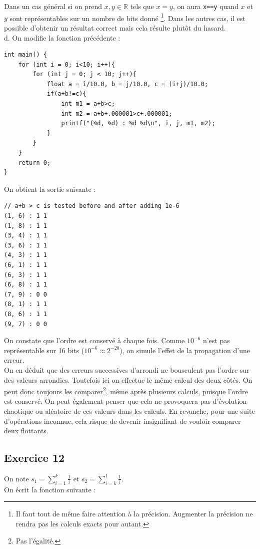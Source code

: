 \documentclass[11pt, a4 paper]{article}
\begin{document}
Dans un cas général si on prend $x, y \in \mathbb{R}$ tels que $x=y$, on aura \texttt{x==y} quand $x$ et $y$ sont représentables sur un nombre de bits donné
    \footnote{
        Il faut tout de même faire attention à la précision.
        Augmenter la précision ne rendra pas les calculs exacts pour autant.
    }.
Dans les autres cas, il est possible d'obtenir un résultat correct mais cela résulte plutôt du hasard.\\

d. On modifie la fonction précédente :
\begin{lstlisting}[style=CStyle]
int main() {
    for (int i = 0; i<10; i++){
        for (int j = 0; j < 10; j++){
            float a = i/10.0, b = j/10.0, c = (i+j)/10.0;
            if(a+b!=c){
                int m1 = a+b>c;
                int m2 = a+b+.000001>c+.000001;
                printf("(%d, %d) : %d %d\n", i, j, m1, m2);
            }
        }
    } 
    return 0;
}
\end{lstlisting}

On obtient la sortie suivante :
\begin{lstlisting}[style=CStyle]
// a+b > c is tested before and after adding 1e-6
(1, 6) : 1 1
(1, 8) : 1 1
(3, 4) : 1 1
(3, 6) : 1 1
(4, 3) : 1 1
(6, 1) : 1 1
(6, 3) : 1 1
(6, 8) : 1 1
(7, 9) : 0 0
(8, 1) : 1 1
(8, 6) : 1 1
(9, 7) : 0 0
\end{lstlisting}
On constate que l'ordre est conservé à chaque fois.
Comme $10^{-6}$ n'est pas représentable sur 16 bits ($10^{-6} \approx 2^{-20}$), on simule l'effet de la propagation d'une erreur.\\
On en déduit que des erreurs successives d'arrondi ne bousculent pas l'ordre sur des valeurs arrondies.
Toutefois ici on effectue le même calcul des deux côtés.
On peut donc toujours les comparer\footnote{Pas l'égalité.}, même après plusieurs calculs, puisque l'ordre est conservé.
On peut également penser que cela ne provoquera pas d'évolution chaotique ou aléatoire de ces valeurs dans les calculs.
En revanche, pour une suite d'opérations inconnue, cela risque de devenir insignifiant de vouloir comparer deux flottants.

\subsection{Exercice 12}
On note $s_1 = \displaystyle{\sum_{i=1}^{k} \frac{1}{i}}$ et $s_2 = \displaystyle{\sum_{i=k}^{1} \frac{1}{i}}$.\\
On écrit la fonction suivante :
\end{document}
